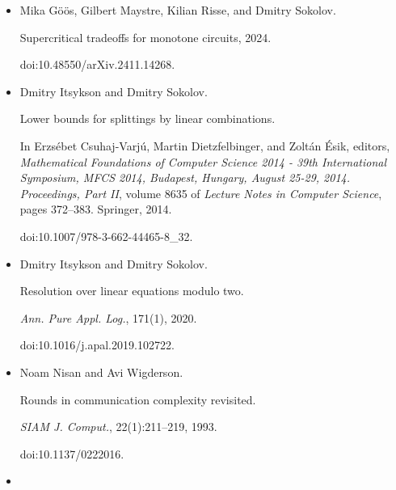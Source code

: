 \begin{itemize}
\emph{Theory Comput.}, 16:1–30, 2020.


Preliminary version in STOC 2018.


doi:10.4086/TOC.2020.V016A013.





\item[] 
[18]

Mika Göös, Gilbert Maystre, Kilian Risse, and Dmitry Sokolov.


Supercritical tradeoffs for monotone circuits, 2024.


doi:10.48550/arXiv.2411.14268.





\item[] 
[19]

Dmitry Itsykson and Dmitry Sokolov.


Lower bounds for splittings by linear combinations.


In Erzsébet Csuhaj-Varjú, Martin Dietzfelbinger, and
Zoltán Ésik, editors, \emph{Mathematical Foundations of Computer
Science 2014 - 39th International Symposium, MFCS 2014, Budapest, Hungary,
August 25-29, 2014. Proceedings, Part II}, volume 8635 of \emph{Lecture
Notes in Computer Science}, pages 372–383. Springer, 2014.


doi:10.1007/978-3-662-44465-8\_32.





\item[] 
[20]

Dmitry Itsykson and Dmitry Sokolov.


Resolution over linear equations modulo two.


\emph{Ann. Pure Appl. Log.}, 171(1), 2020.


doi:10.1016/j.apal.2019.102722.





\item[] 
[21]

Noam Nisan and Avi Wigderson.


Rounds in communication complexity revisited.


\emph{SIAM J. Comput.}, 22(1):211–219, 1993.


doi:10.1137/0222016.





\item[] 
[22]


\end{itemize}

